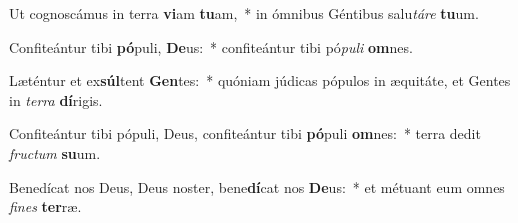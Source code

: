 \item Ut cognoscámus in terra \textbf{vi}am \textbf{tu}am,~* in ómnibus Géntibus salu\textit{tá}\textit{re} \textbf{tu}um.
\item Confiteántur tibi \textbf{pó}puli, \textbf{De}us:~* confiteántur tibi pó\textit{pu}\textit{li} \textbf{om}nes.
\item Læténtur et ex\textbf{súl}tent \textbf{Gen}tes:~* quóniam júdicas pópulos in æquitáte, et Gentes in \textit{ter}\textit{ra} \textbf{dí}rigis.
\item Confiteántur tibi pópuli, Deus, confiteántur tibi \textbf{pó}puli \textbf{om}nes:~* terra dedit \textit{fruc}\textit{tum} \textbf{su}um.
\item Benedícat nos Deus, Deus noster, bene\textbf{dí}cat nos \textbf{De}us:~* et métuant eum omnes \textit{fi}\textit{nes} \textbf{ter}ræ.
